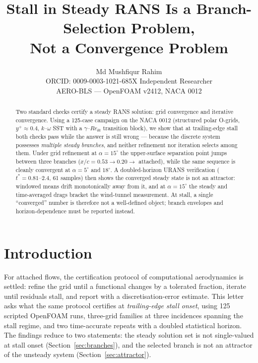\documentclass[10pt,a4paper]{article}
\title{\textbf{Stall in Steady RANS Is a Branch-Selection Problem,\\ Not a Convergence Problem}}
\author{Md Mushfiqur Rahim\\
  \small ORCID: 0009-0003-1021-685X \quad Independent Researcher \\ \small AERO-BLS --- OpenFOAM v2412, NACA 0012}
\date{}
\begin{document}
\maketitle
\vspace{-2.0em}

\begin{abstract}
\noindent Two standard checks certify a steady RANS solution: grid convergence and iterative convergence. Using a 125-case campaign on the NACA 0012 (structured polar O-grids, $y^+ \approx 0.4$, $k$--$\omega$ SST with a $\gamma$--$Re_{\theta t}$ transition block), we show that at trailing-edge stall both checks pass while the answer is still wrong --- because the discrete system possesses \emph{multiple steady branches}, and neither refinement nor iteration selects among them. Under grid refinement at $\alpha = 15^\circ$ the upper-surface separation point jumps between three branches ($x/c = 0.53 \to 0.20 \to$ attached), while the same sequence is cleanly convergent at $\alpha = 5^\circ$ and $18^\circ$. A doubled-horizon URANS verification ($t^* = 0.81$--$2.4$, 61 samples) then shows the converged steady state is not an attractor: windowed means drift monotonically away from it, and at $\alpha = 15^\circ$ the steady and time-averaged drags bracket the wind-tunnel measurement. At stall, a single ``converged'' number is therefore not a well-defined object; branch envelopes and horizon-dependence must be reported instead.
\end{abstract}

\section{Introduction}
For attached flows, the certification protocol of computational aerodynamics is settled: refine the grid until a functional changes by a tolerated fraction, iterate until residuals stall, and report with a discretisation-error estimate. This letter asks what the same protocol certifies at \emph{trailing-edge stall onset}, using 125 scripted OpenFOAM runs, three-grid families at three incidences spanning the stall regime, and two time-accurate repeats with a doubled statistical horizon. The findings reduce to two statements: the steady solution set is not single-valued at stall onset (Section~\ref{sec:branches}), and the selected branch is not an attractor of the unsteady system (Section~\ref{sec:attractor}).
\end{document}
